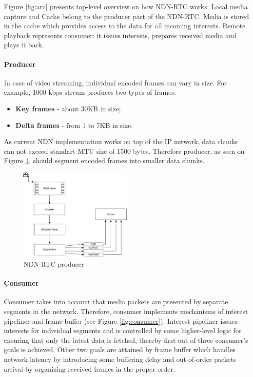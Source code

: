 \documentclass[10pt]{proc}
\begin{document}
Figure \ref{fig:arc} presents top-level overview on how NDN-RTC works. Local media capture and Cache belong to the producer part of the NDN-RTC. Media is stored in the cache which provides access to the data for all incoming interests. Remote playback represents consumer: it issues interests, prepares received media and plays it back.

\paragraph{Producer}

In case of video streaming, individual encoded frames can vary in size. For example, 1000 kbps stream produces two types of frames:
\begin{itemize}
\item \textbf{Key frames} - about 30KB in size;
\item \textbf{Delta frames} - from 1 to 7KB in size. 
\end{itemize}

As current NDN implementation works on top of the IP network, data chunks can not exceed standart MTU size of 1500 bytes. Therefore producer, as seen on Figure \ref{fig:producer}, should segment encoded frames into smaller data chunks.

\begin{figure}[Ht!]
\centering
\includegraphics[width=0.5\textwidth]{producer}
\caption{NDN-RTC producer}
\label{fig:producer}
\end{figure}

\paragraph{Consumer}

Consumer takes into account that media packets are presented by separate segments in the network. Therefore, consumer implements mechanisms of interest pipeliner and frame buffer (see Figure \ref{fig:consumer}). Interest pipeliner issues interests for individual segments and is controlled by some higher-level logic for ensuring that only the latest data is fetched, thereby first out of three consumer's goals is achieved. Other two goals are attained by frame buffer which handles network latency by introducing some buffering delay and out-of-order packets arrival by organizing received frames in the proper order. 
\end{document}
